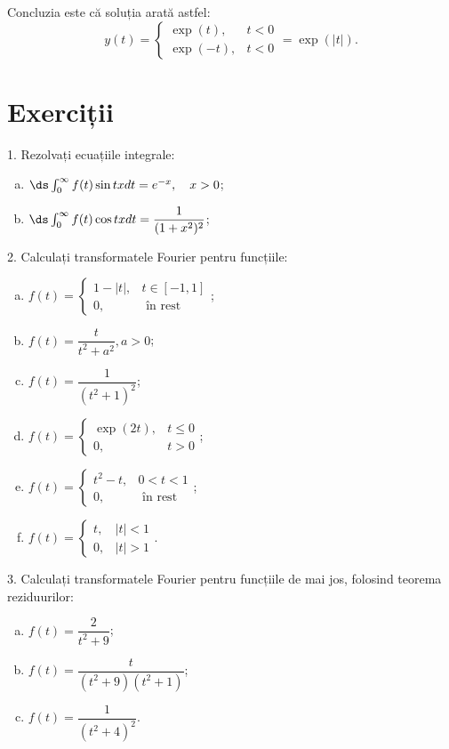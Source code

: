 Concluzia este că soluția arată astfel:
\[
  y(t) = \begin{cases}
    \exp(t), & t < 0 \\
    \exp(-t), & t < 0
  \end{cases} = \exp\left(|t|\right).  
\]


\section{Exerciții}

1. Rezolvați ecuațiile integrale:
\begin{enumerate}[(a)]
\item $ \ds\int_0^\infty f(t) \sin tx dt = e^{-x}, \quad x > 0 $;
\item $ \ds\int_0^\infty f(t) \cos tx dt = \dfrac{1}{(1 + x^2)^2} $;
\end{enumerate}

\vspace{0.3cm}

2. Calculați transformatele Fourier pentru funcțiile:
\begin{enumerate}[(a)]
\item $ f(t) = \begin{cases} 1 - |t|, & t \in [-1, 1] \\ 0, & \text{ în rest} \end{cases} $;
\item $ f(t) = \dfrac{t}{t^2 + a^2}, a > 0 $;
\item $ f(t) = \dfrac{1}{(t^2 + 1)^2} $;
\item $ f(t) = \begin{cases} \exp(2t), & t \leq 0 \\ 0, & t > 0 \end{cases} $;
\item $ f(t) = \begin{cases} t^2 - t, & 0 < t < 1 \\ 0, & \text{ în rest} \end{cases} $;
\item $ f(t) = \begin{cases} t, & |t| < 1 \\ 0, & |t| > 1 \end{cases} $.
\end{enumerate}

\vspace{0.3cm}

3. Calculați transformatele Fourier pentru funcțiile de mai jos,
folosind teorema reziduurilor:
\begin{enumerate}[(a)]
\item $ f(t) = \dfrac{2}{t^2 + 9} $;
\item $ f(t) = \dfrac{t}{(t^2 + 9)(t^2 + 1)} $;
\item $ f(t) = \dfrac{1}{(t^2 + 4)^2} $.
\end{enumerate}




